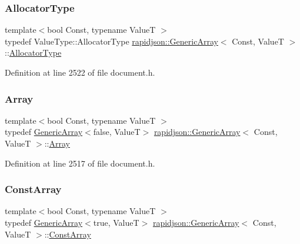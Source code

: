 \subsubsection{\texorpdfstring{AllocatorType}{AllocatorType}}
{\footnotesize\ttfamily template$<$bool Const, typename ValueT $>$ \\
typedef Value\+Type\+::\+Allocator\+Type \mbox{\hyperlink{classrapidjson_1_1_generic_array}{rapidjson\+::\+Generic\+Array}}$<$ Const, ValueT $>$\+::\mbox{\hyperlink{classrapidjson_1_1_generic_array_a82298d507b2b15c9d909c25a32f5afeb}{Allocator\+Type}}}



Definition at line 2522 of file document.\+h.

\mbox{\label{classrapidjson_1_1_generic_array_ae82a8e56892743f606ae07da8f9a2f5a}} 
\subsubsection{\texorpdfstring{Array}{Array}}
{\footnotesize\ttfamily template$<$bool Const, typename ValueT $>$ \\
typedef \mbox{\hyperlink{classrapidjson_1_1_generic_array}{Generic\+Array}}$<$false, ValueT$>$ \mbox{\hyperlink{classrapidjson_1_1_generic_array}{rapidjson\+::\+Generic\+Array}}$<$ Const, ValueT $>$\+::\mbox{\hyperlink{classrapidjson_1_1_generic_array_ae82a8e56892743f606ae07da8f9a2f5a}{Array}}}



Definition at line 2517 of file document.\+h.

\mbox{\label{classrapidjson_1_1_generic_array_a6f2b607cc4e648e5b250dea147843476}} 
\subsubsection{\texorpdfstring{ConstArray}{ConstArray}}
{\footnotesize\ttfamily template$<$bool Const, typename ValueT $>$ \\
typedef \mbox{\hyperlink{classrapidjson_1_1_generic_array}{Generic\+Array}}$<$true, ValueT$>$ \mbox{\hyperlink{classrapidjson_1_1_generic_array}{rapidjson\+::\+Generic\+Array}}$<$ Const, ValueT $>$\+::\mbox{\hyperlink{classrapidjson_1_1_generic_array_a6f2b607cc4e648e5b250dea147843476}{Const\+Array}}}



